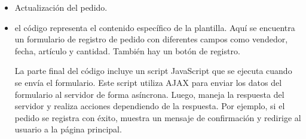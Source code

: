 \documentclass{article}
\begin{document}
\begin{itemize}
\begin{itemize}
            \begin{itemize}
                \item Actualización del pedido.
            \end{itemize}
            

            \begin{itemize}
                \item el código representa el contenido específico de la plantilla. Aquí se encuentra un formulario de registro de pedido con diferentes campos como vendedor, fecha, artículo y cantidad. También hay un botón de registro.

                La parte final del código incluye un script JavaScript que se ejecuta cuando se envía el formulario. Este script utiliza AJAX para enviar los datos del formulario al servidor de forma asíncrona. Luego, maneja la respuesta del servidor y realiza acciones dependiendo de la respuesta. Por ejemplo, si el pedido se registra con éxito, muestra un mensaje de confirmación y redirige al usuario a la página principal.
            \end{itemize}
            


\end{itemize}
\end{itemize}
\end{document}
